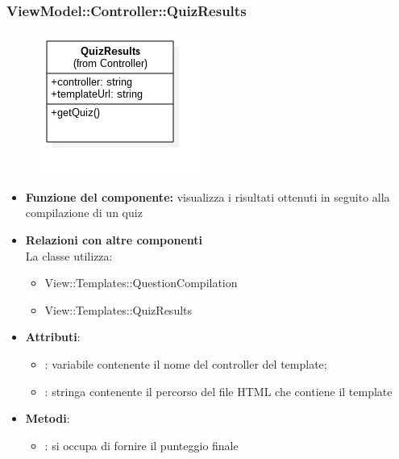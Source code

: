  \subsubsection{ViewModel::Controller::QuizResults}
 \begin{figure}[h!]
\begin{center}
	\includegraphics[scale=0.4]{../images/ViewModel/Controller/QuizResults.png}
\end{center}
\end{figure}
 \begin{itemize}
 \item\textbf{Funzione del componente:} visualizza i risultati ottenuti in seguito alla compilazione di un quiz
 \item\textbf{Relazioni con altre componenti}\\
 La classe utilizza:
 	\begin{itemize}
 		\item View::Templates::QuestionCompilation
 		\item View::Templates::QuizResults
 	\end{itemize}
 \item\textbf{Attributi}:
 	\begin{itemize}
 		\item{}: variabile contenente il nome del controller del template;\\
		\item{}: stringa contenente il percorso del file HTML che contiene il template\\
 	\end{itemize}
 	\item\textbf{Metodi}:
 	\begin{itemize}
 		\item{}: si occupa di fornire il punteggio finale
 	\end{itemize}
 \end{itemize}
\newpage
 
